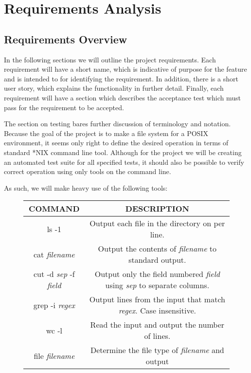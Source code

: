 \section{Requirements Analysis}\label{sec:requirements}

\subsection{Requirements Overview}

In the following sections we will outline the project requirements. Each
requirement will have a short name, which is indicative of purpose for the
feature and is intended to for identifying the requirement. In addition, there
is a short user story, which explains the functionality in further detail.
Finally, each requirement will have a section which describes the acceptance
test which must pass for the requirement to be accepted.

The section on testing bares further discussion of terminology and notation.
Because the goal of the project is to make a file system for a POSIX
environment, it seems only right to define the desired operation in terms of
standard *NIX command line tool. Although for the project we will be creating an
automated test suite for all specified tests, it should also be possible to
verify correct operation using only tools on the command line.

As such, we will make heavy use of the following tools:

\begin{figure}[H]
\centering
\begin{tabular}{|c|c|}
\hline
COMMAND & DESCRIPTION \\\hline

ls -1 & Output each file in the directory on per line.\\

cat \textit{filename} & Output the contents of \textit{filename} to standard
output.\\

cut -d \textit{sep} -f \textit{field} & Output only the field numbered
\textit{field} using \textit{sep} to separate columns.\\

grep -i \textit{regex} & Output lines from the input that match \textit{regex}.
Case insensitive.\\

wc -l & Read the input and output the number of lines.\\

file \textit{filename} & Determine the file type of \textit{filename} and output\\\hline
\end{tabular}
\end{figure}

